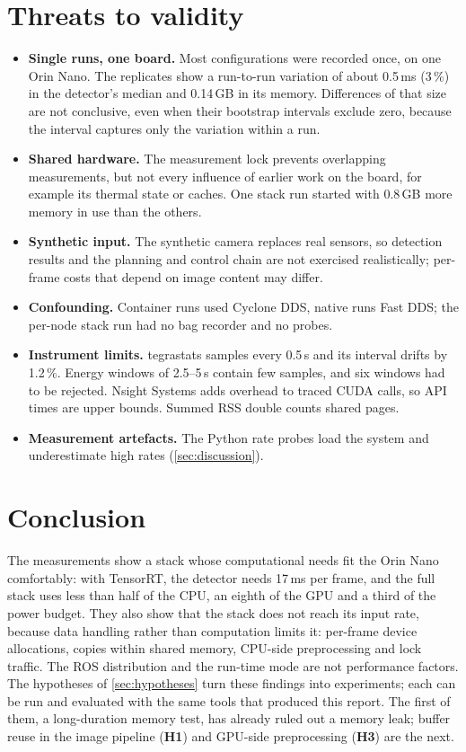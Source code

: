 \documentclass[11pt,a4paper]{article}
\newcommand{\hyp}[1]{\textbf{H#1}}
\begin{document}
\section{Threats to validity}\label{sec:threats}
\begin{itemize}
  \item \textbf{Single runs, one board.} Most configurations were recorded once, on one Orin Nano. The replicates
        show a run-to-run variation of about 0.5\,ms (3\,\%) in the detector's median and 0.14\,GB in its memory.
        Differences of that size are not conclusive, even when their bootstrap intervals exclude zero, because the
        interval captures only the variation within a run.
  \item \textbf{Shared hardware.} The measurement lock prevents overlapping measurements, but not every influence of
        earlier work on the board, for example its thermal state or caches. One stack run started with 0.8\,GB more
        memory in use than the others.
  \item \textbf{Synthetic input.} The synthetic camera replaces real sensors, so detection results and the
        planning and control chain are not exercised realistically; per-frame costs that depend on image content may
        differ.
  \item \textbf{Confounding.} Container runs used Cyclone DDS, native runs Fast DDS; the per-node stack run had no
        bag recorder and no probes.
  \item \textbf{Instrument limits.} tegrastats samples every 0.5\,s and its interval drifts by 1.2\,\%. Energy windows
        of 2.5--5\,s contain few samples, and six windows had to be rejected. Nsight Systems adds overhead to traced
        CUDA calls, so API times are upper bounds. Summed RSS double counts shared pages.
  \item \textbf{Measurement artefacts.} The Python rate probes load the system and underestimate high rates
        (\cref{sec:discussion}).
\end{itemize}

\section{Conclusion}
The measurements show a stack whose computational needs fit the Orin Nano comfortably: with TensorRT, the detector
needs 17\,ms per frame, and the full stack uses less than half of the CPU, an eighth of the GPU and a third of the
power budget. They also show that the stack does not reach its input rate, because data handling rather than
computation limits it: per-frame device allocations, copies within shared memory, CPU-side preprocessing and lock
traffic. The ROS distribution and the run-time mode are not performance factors. The hypotheses of
\cref{sec:hypotheses} turn these findings into experiments; each can be run and evaluated with the same tools that
produced this report. The first of them, a long-duration memory test, has already ruled out a memory leak; buffer
reuse in the image pipeline (\hyp{1}) and GPU-side preprocessing (\hyp{3}) are the next.
\end{document}
